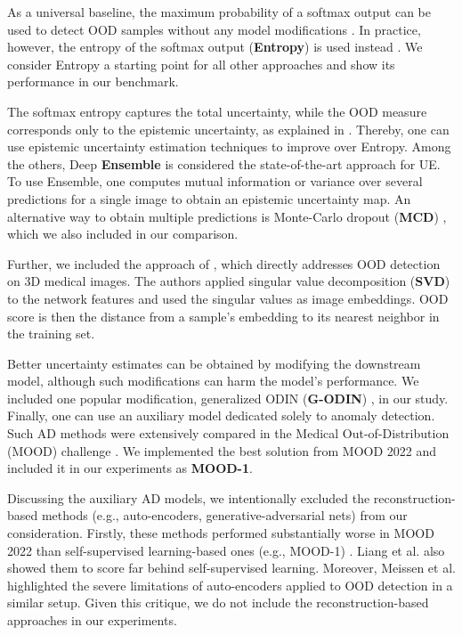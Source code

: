 As a universal baseline, the maximum probability of a softmax output can be used to detect OOD samples without any model modifications \cite{hendrycks2016baseline}. In practice, however, the entropy of the softmax output (\textbf{Entropy}) is used instead \cite{jungo2019assessing,karimi2022improving,mehrtash2020confidence}. We consider Entropy a starting point for all other approaches and show its performance in our benchmark.

The softmax entropy captures the total uncertainty, while the OOD measure corresponds only to the epistemic uncertainty, as explained in \cite{smith2018understanding}. Thereby, one can use epistemic uncertainty estimation techniques to improve over Entropy. Among the others, Deep \textbf{Ensemble} \cite{lakshminarayanan2017simple} is considered the state-of-the-art approach for UE. To use Ensemble, one computes mutual information or variance over several predictions for a single image to obtain an epistemic uncertainty map. An alternative way to obtain multiple predictions is Monte-Carlo dropout (\textbf{MCD}) \cite{gal2016dropout}, which we also included in our comparison.

Further, we included the approach of \cite{karimi2022improving}, which directly addresses OOD detection on 3D medical images. The authors applied singular value decomposition (\textbf{SVD}) to the network features and used the singular values as image embeddings. OOD score is then the distance from a sample's embedding to its nearest neighbor in the training set.

Better uncertainty estimates can be obtained by modifying the downstream model, although such modifications can harm the model's performance. We included one popular modification, generalized ODIN (\textbf{G-ODIN}) \cite{hsu2020generalized}, in our study. Finally, one can use an auxiliary model dedicated solely to anomaly detection. Such AD methods were extensively compared in the Medical Out-of-Distribution (MOOD) challenge \cite{david_zimmerer_2022_6362313}. We implemented the best solution from MOOD 2022 and included it in our experiments as \textbf{MOOD-1}.

Discussing the auxiliary AD models, we intentionally excluded the reconstruction-based methods (e.g., auto-encoders, generative-adversarial nets) from our consideration. Firstly, these methods performed substantially worse in MOOD 2022 than self-supervised learning-based ones (e.g., MOOD-1) \cite{zimmerer2022mood}. Liang et al. \cite{liang2023omni} also showed them to score far behind self-supervised learning. Moreover, Meissen et al. \cite{meissen2022pitfalls} highlighted the severe limitations of auto-encoders applied to OOD detection in a similar setup. Given this critique, we do not include the reconstruction-based approaches in our experiments.

